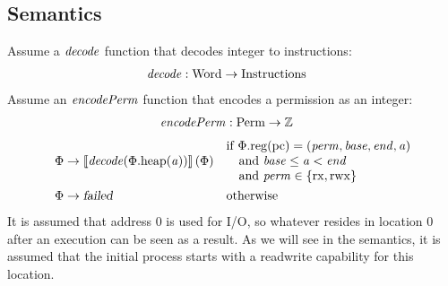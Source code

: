 \documentclass{article}
\newcommand{\sem}[1]{\left\llbracket #1 \right\rrbracket}
\newcommand{\var}[1]{\mathit{#1}}
\newcommand{\pcreg}{\mathrm{pc}}
\newcommand{\addr}{\var{a}}
\newcommand{\start}{\var{base}}
\newcommand{\addrend}{\var{end}}
\newcommand{\perm}{\var{perm}}
\newcommand{\stdcap}[1][\perm]{\left(#1,\start,\addrend,\addr \right)}
\newcommand{\plainproj}[1]{\mathrm{#1}}
\newcommand{\memheap}[1][\Phi]{#1.\plainproj{heap}}
\newcommand{\memreg}[1][\Phi]{#1.\plainproj{reg}}
\newcommand{\failed}{\textsl{failed}}
\newcommand{\plainfun}[2]{
  \ifthenelse{\equal{#2}{}}
             {\mathit{#1}}
             {\mathit{#1}(#2)}
}
\newcommand{\decode}{\plainfun{decode}{}}
\newcommand{\encodePerm}{\plainfun{encodePerm}{}}
\newcommand{\plaindom}[1]{\mathrm{#1}}
\newcommand{\Words}{\plaindom{Word}}
\newcommand{\Instrs}{\plaindom{Instructions}}
\newcommand{\ints}{\mathbb{Z}}
\newcommand{\Perms}{\plaindom{Perm}}
\newcommand{\plainperm}[1]{\mathrm{#1}}
\newcommand{\exec}{\plainperm{rx}}
\newcommand{\rwx}{\plainperm{rwx}}
\begin{document}
\subsection*{Semantics}
Assume a $\decode$ function that decodes integer to instructions:
\begin{align*}
\decode &:\Words \rightarrow \Instrs
\end{align*}
Assume an $\encodePerm$ function that encodes a permission as an integer:
\begin{align*}
\encodePerm &: \Perms \rightarrow \ints
\end{align*}
\begin{align*}
  \Phi & \rightarrow \sem{\decode(\memheap(\addr))}(\Phi) & &                                   
                                                              \arraycolsep=0pt
                                                              \begin{array}{l}
                                                                \text{if $\memreg(\pcreg) = \stdcap$}\\
                                                                \quad\text{and $\start \leq \addr < \addrend$}\\
                                                                \quad\text{and $\perm \in \{ \exec,\rwx \}$ }
                                                              \end{array}\\
\Phi & \rightarrow \failed                                 & & \text{otherwise}
\end{align*}
It is assumed that address 0 is used for I/O, so whatever resides in location 0 after an execution can be seen as a result. As we will see in the semantics, it is assumed that the initial process starts with a readwrite capability for this location.
\end{document}
